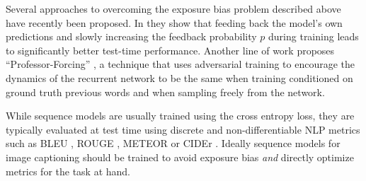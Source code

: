 \documentclass[10pt,twocolumn,letterpaper]{article}
\begin{document}
Several approaches to overcoming the exposure bias problem described above have recently been proposed. In \cite{ScheduledSampling} they show that feeding back the model's own predictions and slowly increasing the feedback probability $p$ during training leads to significantly better test-time performance.
Another line of work proposes ``Professor-Forcing'' \cite{ProfessorForcing}, a technique that uses adversarial training to encourage the dynamics of the recurrent network to be the same when training conditioned on ground truth previous words and when sampling freely from the network. 

While sequence models are usually trained using the cross entropy loss, they are typically evaluated at test time using discrete and non-differentiable NLP metrics such as BLEU \cite{BLEU}, ROUGE \cite{lin2004rouge}, METEOR \cite{banerjee2005meteor} or CIDEr \cite{CIDEr}. 
Ideally sequence models for image captioning should be trained to avoid  exposure bias \emph{and} directly optimize metrics for the task at hand.
\end{document}

